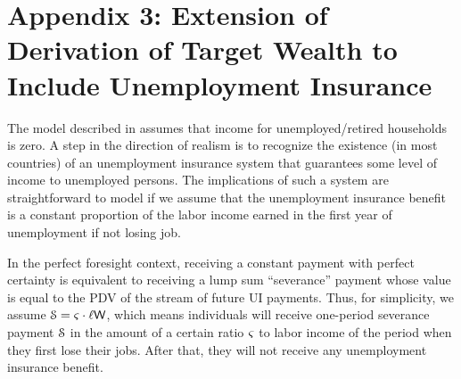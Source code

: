 

\section*{Appendix 3: Extension of Derivation of Target Wealth to Include Unemployment Insurance}\label{apdxUI}

The model described in \cite{ctDiscrete} assumes that income for
unemployed/retired households is zero.  A step in the direction of
realism is to recognize the existence (in most countries) of an unemployment
insurance system that guarantees some level of income to unemployed
persons.  The implications of such a system are straightforward to
model if we assume that the unemployment insurance benefit is a
constant proportion of the labor income earned in the first year of unemployment if not losing job.

In the perfect foresight context, receiving a constant payment with
perfect certainty is equivalent to receiving a lump sum ``severance''
payment whose value is equal to the PDV of the stream of future UI
payments.  Thus, for simplicity, we assume
$\mathcal{S}=\varsigma\cdot\ell\mathsf{W}$, which means
individuals will receive one-period severance payment $\mathcal{S}$ in the amount of
a certain ratio $\varsigma$ to labor income of the period when they first lose their jobs. After that, they will not receive any unemployment
insurance benefit.

